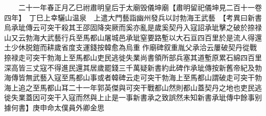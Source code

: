 　　二十一年春正月乙巳祔肅明皇后于太廟毁儀坤廟【肅明留祀儀坤見二百十一卷四年】　丁巳上幸驪山温泉　上遣大門藝詣幽州發兵以討勃海王武藝　【考異曰新書烏承玼傳云可突干殺其王邵固降突厥而奚亦亂是歲奚契丹入寇詔承玼擊之破於捺禄山又云勃海大武藝行兵至馬都山屠城邑承玼窒要路塹以大石亘四百里於是流人得還土少休脱鎧而耕歲省度支運錢按韓愈為烏重作廟碑叙重胤父承洽云屢破契丹從戰捺禄走可突干勃海上至馬都山吏民逃徙失業尚書領所部兵塞其道塹原累石綿四百里深高皆三丈寇不得進民還其居歲罷錢三千萬疑新書約此碑作承玼傳按新舊帝紀及勃海傳皆無武藝入寇至馬都山事或者韓碑云走可突干勃海上至馬都山謂破走可突干勃海上追之至馬都山耳二十一年郭英傑與可突干戰都山然則都山蓋契丹之地也吏民逃徙失業蓋因可突干入寇而然與上止是一事新書承之致誤然未知新書承玼傳中餘事别據何書】庚申命太僕員外卿金思